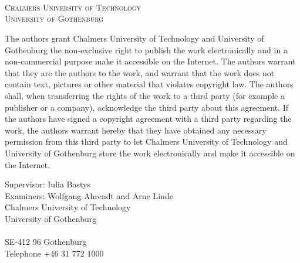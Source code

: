 \newpage
\thispagestyle{empty}
\begin{center}

    \textbf{\Large \ambaTitle} \\[1cm]

    {\linespread{1.2}\large
    \StrSubstitute{\ambaAuthors}{,}{\\}
    \\
    }

    \vfill

    \ambaDepartment \\
    \textsc{Chalmers University of Technology} \\
    \textsc{University of Gothenburg} \\
    \ambaCityCountryYear
\end{center}


\newpage
{The authors grant Chalmers University of Technology and University of Gothenburg the
    non-exclusive right to publish the work electronically and in a non-commercial purpose make it
    accessible on the Internet. The authors warrant that they are the authors to the work, and
    warrant that the work does not contain text, pictures or other material that violates
    copyright law.
    The authors shall, when transferring the rights of the work to a third party (for example a
    publisher or a company), acknowledge the third party about this agreement. If the authors have
    signed a copyright agreement with a third party regarding the work, the authors warrant
    hereby that they have obtained any necessary permission from this third party to let Chalmers
    University of Technology and University of Gothenburg store the work electronically and make
    it accessible on the Internet.}

Supervisor: Iulia Bastys \\
Examiners: Wolfgang Ahrendt and Arne Linde \\[1cm]


Chalmers University of Technology\\
University of Gothenburg\\
\ambaDepartment \\
SE-412 96 Gothenburg\\
Telephone +46 31 772 1000 \setlength{\parskip}{0.5cm}

\vfill
\ambaCityCountryYear
